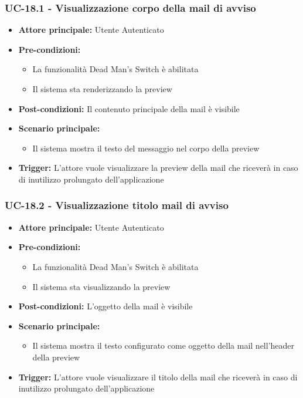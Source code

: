 \documentclass[a4paper,12pt]{article}
\begin{document}
\subsubsection{UC-18.1 - Visualizzazione corpo della mail di avviso} \label{subsec:UC-18.1}
\begin{itemize}
    \item \textbf{Attore principale:} Utente Autenticato
    \item \textbf{Pre-condizioni:}
    \begin{itemize}
        \item La funzionalità Dead Man's Switch è abilitata
        \item Il sistema sta renderizzando la preview
    \end{itemize}
    \item \textbf{Post-condizioni:} Il contenuto principale della mail è visibile
    \item \textbf{Scenario principale:} 
    \begin{itemize}
        \item Il sistema mostra il testo del messaggio nel corpo della preview
    \end{itemize}
    \item \textbf{Trigger:} L'attore vuole visualizzare la preview della mail che riceverà in caso di inutilizzo prolungato dell'applicazione
\end{itemize}

\subsubsection{UC-18.2 - Visualizzazione titolo mail di avviso} \label{subsec:UC-18.2}
\begin{itemize}
    \item \textbf{Attore principale:} Utente Autenticato
    \item \textbf{Pre-condizioni:}
    \begin{itemize}
        \item La funzionalità Dead Man's Switch è abilitata
        \item Il sistema sta visualizzando la preview
    \end{itemize}
    \item \textbf{Post-condizioni:} L'oggetto della mail è visibile
    \item \textbf{Scenario principale:} 
    \begin{itemize}
        \item Il sistema mostra il testo configurato come oggetto della mail nell'header della preview
    \end{itemize}
    \item \textbf{Trigger:} L'attore vuole visualizzare il titolo della mail che riceverà in caso di inutilizzo prolungato dell'applicazione
\end{itemize}
\end{document}
